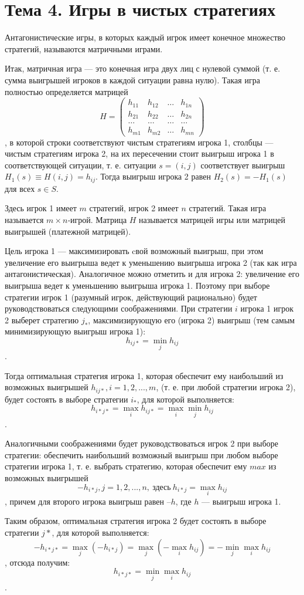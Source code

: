 \section{Тема 4. Игры в чистых стратегиях}

Антагонистические игры, в которых каждый игрок имеет конечное множество стратегий, называются матричными играми.

Итак, матричная игра --- это конечная игра двух лиц с нулевой суммой (т. е. сумма выигрышей игроков в каждой ситуации равна нулю). Такая игра полностью определяется матрицей
\[ H = \begin{pmatrix}
h_{11} & h_{12} & \dots & h_{1n} \\ 
h_{21} & h_{22} & \dots & h_{2n} \\ 
\dots & \dots & \dots & \dots \\ 
h_{m1} & h_{m2} & \dots & h_{mn}
\end{pmatrix}  \],
в которой строки соответствуют чистым стратегиям игрока 1, столбцы --- чистым стратегиям игрока 2, на их пересечении стоит выигрыш игрока 1 в соответствующей ситуации, т. е. ситуации $s = (i, j)$ соответствует выигрыш $H_1(s) \equiv H (i, j) =  h_{ij}$. Тогда выигрыш игрока 2 равен $H_2(s) = - H_1(s)$ для всех $s \in S$.

Здесь игрок 1 имеет $m$ стратегий, игрок 2 имеет $n$ стратегий. Такая игра называется $m\times n$‑игрой. Матрица $H$ называется матрицей игры или матрицей выигрышей (платежной матрицей).

Цель игрока 1 --- максимизировать cвой возможный выигрыш, при этом увеличение его выигрыша ведет к уменьшению выигрыша игрока 2 (так как игра антагонистическая). Аналогичное можно отметить и для игрока 2: увеличение его выигрыша ведет к уменьшению выигрыша игрока 1. Поэтому при выборе стратегии игрок 1 (разумный игрок, действующий рационально) будет руководствоваться следующими соображениями. При стратегии $i$ игрока 1 игрок 2 выберет стратегию $j_*$, максимизирующую его (игрока 2) выигрыш (тем самым минимизирующую выигрыш игрока 1):
\[ h_{ij*} = \min_j h_{ij}\].

Тогда оптимальная стратегия игрока 1, которая обеспечит ему наибольший из возможных выигрышей $h_{ij*}, i = 1, 2, ..., m$, (т. е. при любой стратегии игрока 2), будет состоять в выборе стратегии $i_*$, для которой выполняется:
\[ h_{i*j*} = \max_i h_{ij*} = \max_i \min_j h_{ij} \].

Аналогичными соображениями будет руководствоваться игрок 2 при выборе стратегии: обеспечить наибольший возможный выигрыш при любом выборе стратегии игрока 1, т. е. выбрать стратегию, которая обеспечит ему $max$ из возможных выигрышей
\[ -h_{i*j},j = 1, 2,..., n, \ \text{здесь} \ h_{i*j} = \max_i h_{ij} \],
причем для второго игрока выигрыш равен $–h$, где $h$ --- выигрыш игрока 1.

Таким образом, оптимальная стратегия игрока 2 будет состоять в выборе стратегии $j*$, для которой выполняется:
\[ -h _{i*j*} = \max_j (-h_{i*j}) = \max_j (-\max_i h_{ij}) = - \min_j \max_i h_{ij} \],
отсюда получим:
\[h_{i*j*} = \min_j \max_i h_{ij}\].